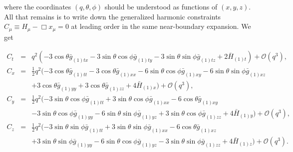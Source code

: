 \documentclass[aps,letterpaper,twocolumn,nofootinbib]{revtex4}
\numberwithin{equation}{section}
\begin{document}
where the coordinates $(q,\theta,\phi)$ should be understood as functions of $(x,y,z)$. 
All that remains is to write down the generalized harmonic constraints $C_\mu \equiv H_\mu-\Box x_\mu = 0$ at leading order in the same near-boundary expansion. We get
\vspace{4\baselineskip}

\begin{widetext}
\begin{eqnarray}
\label{eqn:ct}
C_t&=&q^2 (-3 \cos \theta \bar{g}_{(1)tx}-3 \sin \theta \cos \phi \bar{g}_{(1)ty}-3 \sin \theta \sin \phi \bar{g}_{(1)tz}+2
  \bar{H}_{(1) t})+\mathcal{O}(q^3),\\
%
\label{eqn:cx}
C_x&=&\frac{1}{2} q^2 (-3 \cos \theta  \bar{g}_{(1)tt}-3 \cos \theta  \bar{g}_{(1)xx}-6 \sin \theta  \cos \phi  \bar{g}_{(1)xy}-6 \sin
   \theta  \sin \phi  \bar{g}_{(1)xz} \nonumber \\
  &&+3 \cos \theta  \bar{g}_{(1)yy}+3
   \cos \theta  \bar{g}_{(1)zz}+4 \bar{H}_{(1) x})+\mathcal{O}(q^3),\\
%
\label{eqn:cy}
C_y&=&\frac{1}{2} q^2 (-3 \sin \theta  \cos \phi  \bar{g}_{(1)tt}+3 \sin
   \theta  \cos \phi  \bar{g}_{(1)xx}-6 \cos \theta  \bar{g}_{(1)xy} \nonumber \\
   &&-3
   \sin \theta  \cos \phi  \bar{g}_{(1) yy}-6 \sin \theta  \sin \phi
   \bar{g}_{(1)yz}+3 \sin \theta  \cos \phi  \bar{g}_{(1)zz}+4
   \bar{H}_{(1) y}) +\mathcal{O}(q^3),\\
%
\label{eqn:cz}
C_z&=&\frac{1}{2} q^2 (-3 \sin \theta \sin \phi  \bar{g}_{(1)tt}+3 \sin
   \theta \sin \phi \bar{g}_{(1)xx}-6 \cos \theta  \bar{g}_{(1)xz} \nonumber \\
   &&+3
   \sin \theta \sin \phi  \bar{g}_{(1)yy}-6 \sin \theta  \cos \phi    \bar{g}_{(1)yz}-3 \sin \theta  \sin \phi  \bar{g}_{(1)zz}+4
   \bar{H}_{(1)z})+\mathcal{O}(q^3).
\end{eqnarray}
\end{widetext}
\end{document}
